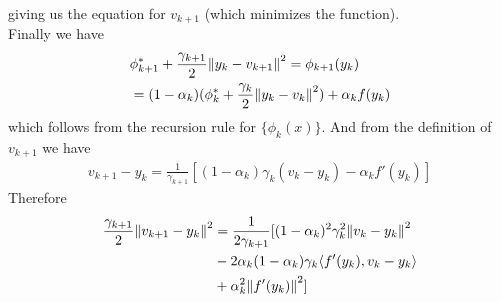 \documentclass[12pt,a4paper]{article}
\begin{document}
	 giving us the equation for $v_{k+1}$ (which minimizes the function).\\
	 Finally we have
	 \begin{align*}
	 	&\phi_{k+1}^* + \frac{\gamma_{k+1}}{2}\norm{y_k - v_{k+1}}^2 = \phi_{k+1}(y_k) \\
	 	&= (1 - \alpha_k)(\phi_k^* + \frac{\gamma_k}{2}\norm{y_k - v_k}^2) + \alpha_kf(y_k)
	 \end{align*}
	 which follows from the recursion rule for $\{\phi_k(x)\}$. And from the definition of $v_{k+1}$ we have
	 \begin{align*}
	 	v_{k+1} - y_k = \frac{1}{\gamma_{k+1}}[(1 - \alpha_k)\gamma_k(v_k - y_k)-\alpha_kf'(y_k)]
	 \end{align*}
	 Therefore
	 \begin{align*}
	 	\frac{\gamma_{k+1}}{2}\norm{v_{k+1} - y_k}^2 &= \frac{1}{2\gamma_{k+1}}[(1 - \alpha_k)^2\gamma_k^2 \norm{v_k - y_k}^2\\
	 	&-2\alpha_k(1 - \alpha_k)\gamma_k\langle f'(y_k), v_k - y_k \rangle \\
	 	&+\alpha_k^2\norm{f'(y_k)}^2]
	 \end{align*}
	 
\end{document}
